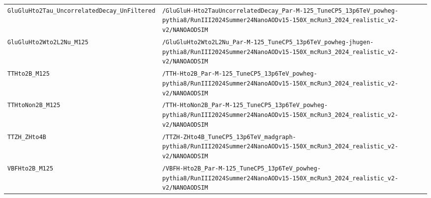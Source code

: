 \begin{longtable}{@{}>{\RaggedRight\arraybackslash}p{} >{\RaggedRight\arraybackslash}p{}@{}}
\addlinespace[2pt]
\texttt{GluGluHto2Tau\_\allowbreak{}UncorrelatedDecay\_\allowbreak{}UnFiltered} & \texttt{/\allowbreak{}GluGluH-\allowbreak{}Hto2TauUncorrelatedDecay\_\allowbreak{}Par-\allowbreak{}M-\allowbreak{}125\_\allowbreak{}TuneCP5\_\allowbreak{}13p6TeV\_\allowbreak{}powheg-\allowbreak{}pythia8/\allowbreak{}RunIII2024Summer24NanoAODv15-\allowbreak{}150X\_\allowbreak{}mcRun3\_\allowbreak{}2024\_\allowbreak{}realistic\_\allowbreak{}v2-\allowbreak{}v2/\allowbreak{}NANOAODSIM} \\
\addlinespace[2pt]
\texttt{GluGluHto2Wto2L2Nu\_\allowbreak{}M125} & \texttt{/\allowbreak{}GluGluHto2Wto2L2Nu\_\allowbreak{}Par-\allowbreak{}M-\allowbreak{}125\_\allowbreak{}TuneCP5\_\allowbreak{}13p6TeV\_\allowbreak{}powheg-\allowbreak{}jhugen-\allowbreak{}pythia8/\allowbreak{}RunIII2024Summer24NanoAODv15-\allowbreak{}150X\_\allowbreak{}mcRun3\_\allowbreak{}2024\_\allowbreak{}realistic\_\allowbreak{}v2-\allowbreak{}v2/\allowbreak{}NANOAODSIM} \\
\addlinespace[2pt]
\texttt{TTHto2B\_\allowbreak{}M125} & \texttt{/\allowbreak{}TTH-\allowbreak{}Hto2B\_\allowbreak{}Par-\allowbreak{}M-\allowbreak{}125\_\allowbreak{}TuneCP5\_\allowbreak{}13p6TeV\_\allowbreak{}powheg-\allowbreak{}pythia8/\allowbreak{}RunIII2024Summer24NanoAODv15-\allowbreak{}150X\_\allowbreak{}mcRun3\_\allowbreak{}2024\_\allowbreak{}realistic\_\allowbreak{}v2-\allowbreak{}v2/\allowbreak{}NANOAODSIM} \\
\addlinespace[2pt]
\texttt{TTHtoNon2B\_\allowbreak{}M125} & \texttt{/\allowbreak{}TTH-\allowbreak{}HtoNon2B\_\allowbreak{}Par-\allowbreak{}M-\allowbreak{}125\_\allowbreak{}TuneCP5\_\allowbreak{}13p6TeV\_\allowbreak{}powheg-\allowbreak{}pythia8/\allowbreak{}RunIII2024Summer24NanoAODv15-\allowbreak{}150X\_\allowbreak{}mcRun3\_\allowbreak{}2024\_\allowbreak{}realistic\_\allowbreak{}v2-\allowbreak{}v2/\allowbreak{}NANOAODSIM} \\
\addlinespace[2pt]
\texttt{TTZH\_\allowbreak{}ZHto4B} & \texttt{/\allowbreak{}TTZH-\allowbreak{}ZHto4B\_\allowbreak{}TuneCP5\_\allowbreak{}13p6TeV\_\allowbreak{}madgraph-\allowbreak{}pythia8/\allowbreak{}RunIII2024Summer24NanoAODv15-\allowbreak{}150X\_\allowbreak{}mcRun3\_\allowbreak{}2024\_\allowbreak{}realistic\_\allowbreak{}v2-\allowbreak{}v2/\allowbreak{}NANOAODSIM} \\
\addlinespace[2pt]
\texttt{VBFHto2B\_\allowbreak{}M125} & \texttt{/\allowbreak{}VBFH-\allowbreak{}Hto2B\_\allowbreak{}Par-\allowbreak{}M-\allowbreak{}125\_\allowbreak{}TuneCP5\_\allowbreak{}13p6TeV\_\allowbreak{}powheg-\allowbreak{}pythia8/\allowbreak{}RunIII2024Summer24NanoAODv15-\allowbreak{}150X\_\allowbreak{}mcRun3\_\allowbreak{}2024\_\allowbreak{}realistic\_\allowbreak{}v2-\allowbreak{}v2/\allowbreak{}NANOAODSIM} \\

\end{longtable}
